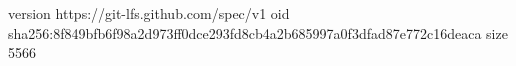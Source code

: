version https://git-lfs.github.com/spec/v1
oid sha256:8f849bfb6f98a2d973ff0dce293fd8cb4a2b685997a0f3dfad87e772c16deaca
size 5566

